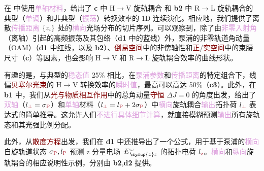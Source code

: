 在  中使用\textcolor{Plum}{单轴材料}，给出了 \textbf{c} 中 H$\to$V \textcolor{NavyBlue}{旋轨耦合} 和 \textbf{b2} 中 R$\to$L \textcolor{NavyBlue}{旋轨耦合}的典型（\textcolor{Plum}{单调}）和非典型（\textcolor{Plum}{振荡}）转换效率的 1D 连续演化。相应地，我们提供了离散\textcolor{Plum}{传播距离} $\{\mathcolor{gray}{z_i}\}$ 处的\textcolor{Plum}{横向}\textcolor{PineGreen}{光场分布}的切片序列。可以观察到，除了由\textcolor{Plum}{非零入射角}（\textcolor{PineGreen}{离轴}）引起的高频振荡及其包络（\textbf{d1} 中的蓝线）外，\textcolor{NavyBlue}{泵浦}的\textcolor{NavyBlue}{非零轨道角动量（OAM）}（\textbf{d1} 中红线，以及 \textbf{b2}）、\textcolor{Maroon}{倒易空间}中的\textcolor{PineGreen}{非傍轴性}和\textcolor{Maroon}{正}/\textcolor{Maroon}{实空间}中的束腰尺寸（\textbf{c}）等因素，也会影响 H$\to$V 和 R$\to$L \textcolor{NavyBlue}{旋轨耦合}效率的曲线形状。

有趣的是，与典型的\textcolor{Plum}{稳态值} 25\% 相比，在\textcolor{Plum}{泵浦参数}和\textcolor{Plum}{传播距离}的特定组合下，\textcolor{PineGreen}{线偏}\textcolor{Maroon}{贝塞尔光束}的 H$\to$V 转换效率的\textcolor{Plum}{瞬时值}，最高可以高达 50\%\cite{liSpintoorbitalAngularMomentum2020}（\textbf{c3}）。此外，在 \textbf{b1} 中，我们从\textcolor{Maroon}{光与物质相互作用}中的\textcolor{NavyBlue}{总角动量}\textcolor{Maroon}{守恒} $\Delta J = 0$ 的角度出发，给出了\textcolor{Plum}{双轴}（$l_{\textcolor{Maroon}{\perp}}=\sigma_{\textcolor{Maroon}{\text{P}}}$）和\textcolor{Plum}{单轴}材料（$l_{\textcolor{Maroon}{\perp}}=l_{\textcolor{Maroon}{\text{P}}}+2\sigma_{\textcolor{Maroon}{\text{P}}}$）中\textcolor{Plum}{横向}\textcolor{NavyBlue}{旋轨耦合}\textcolor{Plum}{输出}\textcolor{NavyBlue}{拓扑荷} $l_{\textcolor{Maroon}{\perp}}$ 表达式的简单推导。这允许人们\textcolor{Plum}{不进行具体细节计算}，就直接模糊预测\textcolor{Plum}{输出}所有\textcolor{NavyBlue}{旋轨态}和其\textcolor{NavyBlue}{光强比例分配}。

此外，从\textcolor{Maroon}{散度方程}出发，我们在 \textbf{d1} 中还推导出了一个公式，用于基于\textcolor{NavyBlue}{泵浦}的\textcolor{Plum}{横向}\textcolor{NavyBlue}{自旋轨道状态} $\sigma_{\textcolor{Maroon}{\text{P}}},l_{\textcolor{Maroon}{\text{P}}}$ 预测 z 分量电场 $\Xint{\mathcolor{gray}{-}}{25}{E}^{\;\!\mathcolor{gray}{\omega}}_{\;\! \symup{z} \mathcolor{gray}{z}}$ 的\textcolor{NavyBlue}{拓扑电荷} $l_{\textcolor{Maroon}{\text{z}}}$。\textcolor{Plum}{横向}和\textcolor{Plum}{纵向}\textcolor{NavyBlue}{旋轨耦合}的相应说明性示例，分别由 \textbf{b2},\textbf{d2} 提供。

